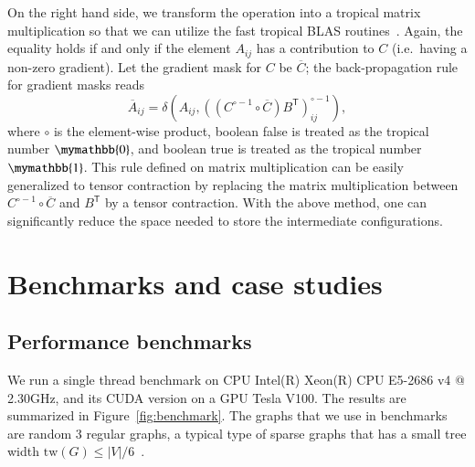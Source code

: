 \documentclass[onefignum, onetabnum]{siamart190516}
\newcommand{\<}{\langle}
\renewcommand{\>}{\rangle}
\begin{document}
On the right hand side, we transform the operation into a tropical matrix multiplication so that we can utilize the fast tropical BLAS routines~\cite{TropicalGEMM}.
Again, the equality holds if and only if the element $A_{ij}$ has a contribution to $C$ (i.e.\ having a non-zero gradient).
Let the gradient mask for $C$ be $\overline C$; the back-propagation rule for gradient masks reads
\begin{equation}
\overline{A}_{ij} = \delta \left(A_{ij}, \left( \left( C^{\circ-1} \circ \overline C \right) B^{\mathsf{T}} \right)_{ij}^{\circ -1} \right),
\end{equation}
where $\circ$ is the element-wise product, boolean false is treated as the tropical number $\mymathbb{0}$, and boolean true is treated as the tropical number $\mymathbb{1}$.
This rule defined on matrix multiplication can be easily generalized to tensor contraction by replacing the matrix multiplication between $C^{\circ-1} \circ \overline C$ and $B^{\mathsf{T}}$ by a tensor contraction.
With the above method, one can significantly reduce the space needed to store the intermediate configurations.

\section{Benchmarks and case studies}
\subsection{Performance benchmarks}
We run a single thread benchmark on CPU Intel(R) Xeon(R) CPU E5-2686 v4 @ 2.30GHz,
and its CUDA version on a GPU Tesla V100.
The results are summarized in Figure~\ref{fig:benchmark}.
The graphs that we use in benchmarks are random 3 regular graphs, a typical type of sparse graphs that has a small tree width $\text{tw}(G) \leq |V|/6$~\cite{Fomin2006}.
\end{document}
